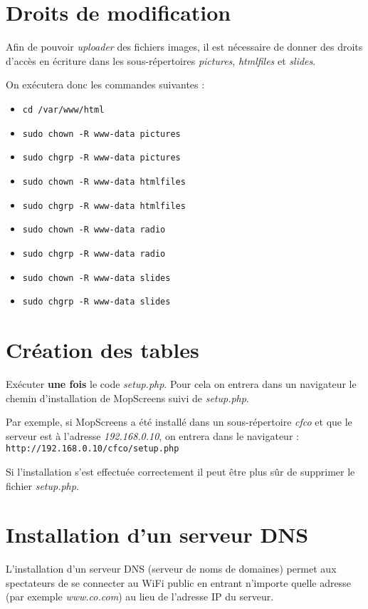 \documentclass[a4paper]{ffco-rapport}
\begin{document}
\section{Droits de modification}
	Afin de pouvoir \emph{uploader} des fichiers images, il est nécessaire de donner des droits d'accès en écriture dans les sous-répertoires \emph{pictures}, \emph{htmlfiles} et \emph{slides}.
	
	On exécutera donc les commandes suivantes :
	
	\begin{itemize}
		\item \verb|cd /var/www/html|
		\item \verb|sudo chown -R www-data pictures|
		\item \verb|sudo chgrp -R www-data pictures|
		\item \verb|sudo chown -R www-data htmlfiles|
		\item \verb|sudo chgrp -R www-data htmlfiles|
		\item \verb|sudo chown -R www-data radio|
		\item \verb|sudo chgrp -R www-data radio|
		\item \verb|sudo chown -R www-data slides|
		\item \verb|sudo chgrp -R www-data slides|
	\end{itemize}
	
\section{Création des tables}
	Exécuter {\bfseries une fois} le code \emph{setup.php}. Pour cela on entrera dans un navigateur le chemin d'installation de MopScreens suivi de \emph{setup.php}.
	
	Par exemple, si MopScreens a été installé dans un sous-répertoire \emph{cfco} et que le serveur est à l'adresse \emph{192.168.0.10}, on entrera dans le navigateur : \verb|http://192.168.0.10/cfco/setup.php|
	
	Si l'installation s'est effectuée correctement il peut être plus sûr de supprimer le fichier \emph{setup.php}.
	
\section{Installation d'un serveur DNS}
	L'installation d'un serveur DNS (serveur de noms de domaines) permet aux spectateurs de se connecter au WiFi public en entrant n'importe quelle adresse (par exemple \emph{www.co.com}) au lieu de l'adresse IP du serveur.
	
\end{document}
